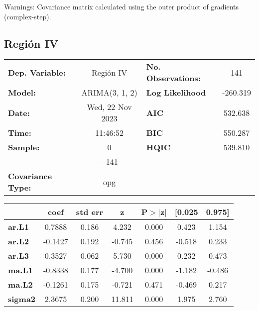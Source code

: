 \documentclass{article}%
\begin{document}
Warnings: \newline
 [1] Covariance matrix calculated using the outer product of gradients (complex-step).%
\subsection*{Región IV}%
\begin{center}
\begin{tabular}{lclc}
\toprule
\textbf{Dep. Variable:}          &    Región IV     & \textbf{  No. Observations:  } &    141      \\
\textbf{Model:}                  &  ARIMA(3, 1, 2)  & \textbf{  Log Likelihood     } &  -260.319   \\
\textbf{Date:}                   & Wed, 22 Nov 2023 & \textbf{  AIC                } &  532.638    \\
\textbf{Time:}                   &     11:46:52     & \textbf{  BIC                } &  550.287    \\
\textbf{Sample:}                 &        0         & \textbf{  HQIC               } &  539.810    \\
\textbf{}                        &       - 141      & \textbf{                     } &             \\
\textbf{Covariance Type:}        &       opg        & \textbf{                     } &             \\
\bottomrule
\end{tabular}
\begin{tabular}{lcccccc}
                & \textbf{coef} & \textbf{std err} & \textbf{z} & \textbf{P$> |$z$|$} & \textbf{[0.025} & \textbf{0.975]}  \\
\midrule
\textbf{ar.L1}  &       0.7888  &        0.186     &     4.232  &         0.000        &        0.423    &        1.154     \\
\textbf{ar.L2}  &      -0.1427  &        0.192     &    -0.745  &         0.456        &       -0.518    &        0.233     \\
\textbf{ar.L3}  &       0.3527  &        0.062     &     5.730  &         0.000        &        0.232    &        0.473     \\
\textbf{ma.L1}  &      -0.8338  &        0.177     &    -4.700  &         0.000        &       -1.182    &       -0.486     \\
\textbf{ma.L2}  &      -0.1261  &        0.175     &    -0.721  &         0.471        &       -0.469    &        0.217     \\
\textbf{sigma2} &       2.3675  &        0.200     &    11.811  &         0.000        &        1.975    &        2.760     \\

\end{tabular}
\end{center}
\end{document}
